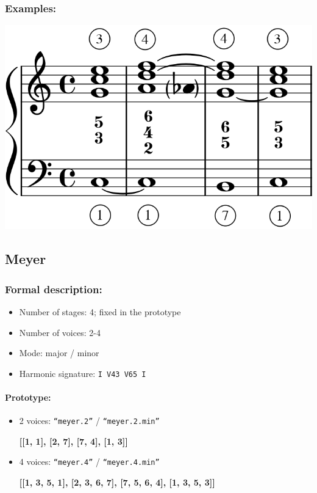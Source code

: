 ﻿\documentclass[11pt, openany]{article}
\begin{document}
\begin{itemize}
\begin{itemize}
\end{itemize}

\subsubsection{Examples:}
\begin{center}
\includegraphics[scale=0.3]{lully.png}
\end{center}


	\subsection{Meyer}
	
\subsubsection{Formal description:}
\begin{itemize}
\item Number of stages: 4; fixed in the prototype
\item Number of voices: 2-4
\item Mode: major / minor
\item Harmonic signature: \texttt{I V43 V65 I}
\end{itemize}

\paragraph{Prototype:}
\begin{itemize}
\item 2 voices: \texttt{“meyer.2”} / \texttt{“meyer.2.min”}
	\begin{center}
	\textbf{[[1, 1], [2, 7], [7, 4], [1, 3]]}
	\end{center}
\item 4 voices: \texttt{“meyer.4”} / \texttt{“meyer.4.min”}
	\begin{center}
	\textbf{[[1, 3, 5, 1], [2, 3, 6, 7], [7, 5, 6, 4], [1, 3, 5, 3]]}
	\end{center}
\end{itemize}


\end{itemize}
\end{document}
